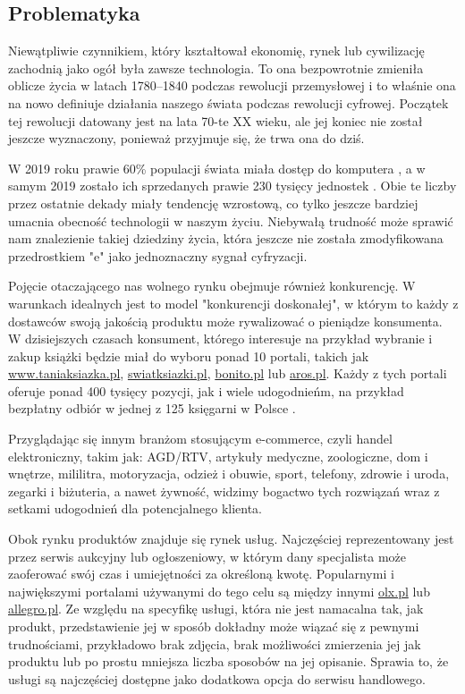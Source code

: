 \documentclass[12pt]{article}
\numberwithin{figure}{section}
\begin{document}
\begin{sloppypar}
\subsection{Problematyka} \label{sec:problematyka}
Niewątpliwie czynnikiem, który kształtował ekonomię, rynek lub cywilizację zachodnią jako ogół była zawsze technologia. To ona bezpowrotnie zmieniła oblicze życia w latach 1780–1840 podczas rewolucji przemysłowej i to właśnie ona na nowo definiuje działania naszego świata podczas rewolucji cyfrowej. Początek tej rewolucji datowany jest na lata 70-te XX wieku, ale jej koniec nie został jeszcze wyznaczony, ponieważ przyjmuje się, że trwa ona do dziś.

W 2019 roku prawie 60\% populacji świata miała dostęp do komputera \cite{internet-users}, a w samym 2019 zostało ich sprzedanych prawie 230 tysięcy jednostek \cite{computers}. Obie te liczby przez ostatnie dekady miały tendencję wzrostową, co tylko jeszcze bardziej umacnia obecność technologii w naszym życiu. Niebywałą trudność może sprawić nam znalezienie takiej dziedziny życia, która jeszcze nie została zmodyfikowana przedrostkiem "e" jako jednoznaczny sygnał cyfryzacji.

Pojęcie otaczającego nas wolnego rynku obejmuje również konkurencję. W warunkach idealnych jest to model "konkurencji doskonałej", w którym to każdy z dostawców swoją jakością produktu może rywalizować o pieniądze konsumenta. W dzisiejszych czasach konsument, którego interesuje na przykład wybranie i zakup książki będzie miał do wyboru ponad 10 portali, takich jak \url{www.taniaksiazka.pl}, \url{swiatksiazki.pl}, \url{bonito.pl} lub \url{aros.pl}. Każdy z tych portali oferuje ponad 400 tysięcy pozycji, jak i wiele udogodnieńm, na przykład bezpłatny odbiór w jednej z 125 księgarni w Polsce \cite{ranking}. 

Przyglądając się innym branżom stosującym e-commerce, czyli handel elektroniczny, takim jak: AGD/RTV, artykuły medyczne, zoologiczne, dom i wnętrze, mililitra, motoryzacja, odzież i obuwie, sport, telefony, zdrowie i uroda, zegarki i biżuteria, a nawet żywność, widzimy bogactwo tych rozwiązań wraz z setkami udogodnień dla potencjalnego klienta. 

Obok rynku produktów znajduje się rynek usług. Najczęściej reprezentowany jest przez serwis aukcyjny lub ogłoszeniowy, w którym dany specjalista może zaoferować swój czas i umiejętności za określoną kwotę. Popularnymi i największymi portalami używanymi do tego celu są między innymi \url{olx.pl} lub \url{allegro.pl}.
Ze względu na specyfikę usługi, która nie jest namacalna tak, jak produkt, przedstawienie jej w sposób dokładny może wiązać się z pewnymi trudnościami, przykładowo brak zdjęcia, brak możliwości zmierzenia jej jak produktu lub po prostu mniejsza liczba sposobów na jej opisanie. Sprawia to, że usługi są najczęściej dostępne jako dodatkowa opcja do serwisu handlowego. 


\end{sloppypar}
\end{document}
